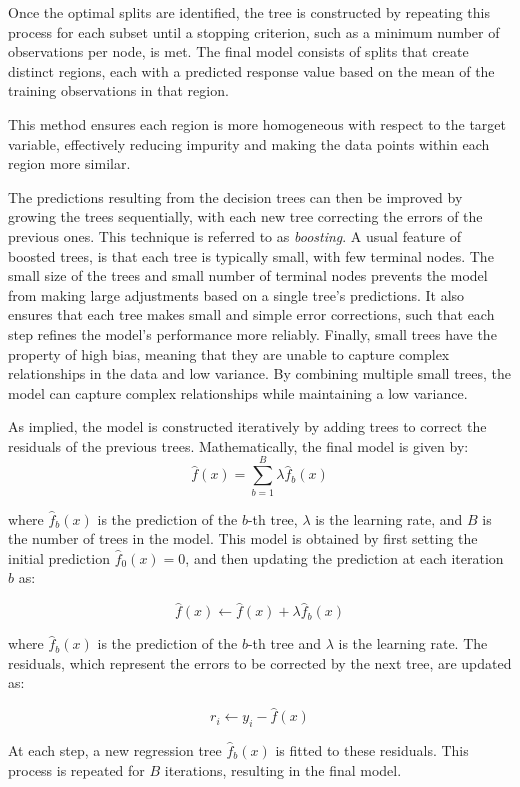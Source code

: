 Once the optimal splits are identified, the tree is constructed by repeating this process for each subset until a stopping criterion, such as a minimum number of observations per node, is met. 
The final model consists of splits that create distinct regions, each with a predicted response value based on the mean of the training observations in that region.

This method ensures each region is more homogeneous with respect to the target variable, effectively reducing impurity and making the data points within each region more similar.

The predictions resulting from the decision trees can then be improved by growing the trees sequentially, with each new tree correcting the errors of the previous ones.
This technique is referred to as \textit{boosting}.
A usual feature of boosted trees, is that each tree is typically small, with few terminal nodes.
The small size of the trees and small number of terminal nodes prevents the model from making large adjustments based on a single tree's predictions.
It also ensures that each tree makes small and simple error corrections, such that each step refines the model's performance more reliably.
Finally, small trees have the property of high bias, meaning that they are unable to capture complex relationships in the data and low variance.
By combining multiple small trees, the model can capture complex relationships while maintaining a low variance.

As implied, the model is constructed iteratively by adding trees to correct the residuals of the previous trees. Mathematically, the final model is given by:
$$
\hat{f}(x) = \sum_{b=1}^{B} \lambda \hat{f}_b(x) 
$$

where $\hat{f}_b(x)$ is the prediction of the $b$-th tree, $\lambda$ is the learning rate, and $B$ is the number of trees in the model.
This model is obtained by first setting the initial prediction $\hat{f}_0(x) = 0$, and then updating the prediction at each iteration $b$ as: 

$$
\hat{f}(x) \leftarrow \hat{f}(x) + \lambda \hat{f}_b(x)
$$

where $\hat{f}_b(x)$ is the prediction of the $b$-th tree and $\lambda$ is the learning rate. 
The residuals, which represent the errors to be corrected by the next tree, are updated as:

$$
r_i \leftarrow y_i - \hat{f}(x)
$$

At each step, a new regression tree $\hat{f}_b(x)$ is fitted to these residuals. 
This process is repeated for $B$ iterations, resulting in the final model.




